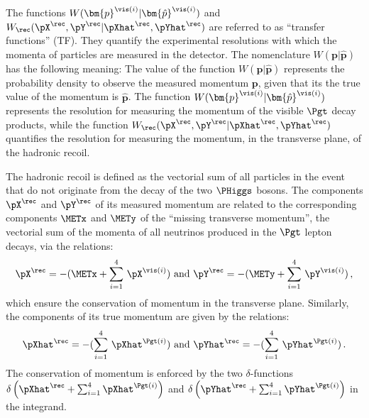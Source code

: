 The functions $W(\bm{p}^{\vis(i)}|\bm{\hat{p}}^{\vis(i)})$ and $W_{\rec}( \pX^{\rec},\pY^{\rec} | \pXhat^{\rec},\pYhat^{\rec} )$ are referred to as ``transfer functions'' (TF).
They quantify the experimental resolutions with which the momenta of particles are measured in the detector.
The nomenclature $W(\bm{p}|\bm{\hat{p}})$ has the following meaning:
The value of the function $W(\bm{p}|\bm{\hat{p}})$ represents the probability density to observe the measured momentum $\bm{p}$,
given that its the true value of the momentum is $\bm{\hat{p}}$.
The function $W(\bm{p}^{\vis(i)}|\bm{\hat{p}}^{\vis(i)})$ represents the resolution for measuring the momentum of the visible $\Pgt$ decay products,
while the function $W_{\rec}( \pX^{\rec},\pY^{\rec} | \pXhat^{\rec},\pYhat^{\rec} )$ quantifies the resolution for measuring the momentum, in the transverse plane, of the hadronic recoil.

The hadronic recoil is defined as the vectorial sum of all particles in the event that do not originate from the decay of the two $\PHiggs$ bosons.
The components $\pX^{\rec}$ and $\pY^{\rec}$ of its measured momentum are related to the corresponding components $\METx$ and $\METy$ of the ``missing transverse momentum'',
the vectorial sum of the momenta of all neutrinos produced in the $\Pgt$ lepton decays, via the relations:
\begin{equation*}
\pX^{\rec} = -( \METx + \sum_{i=1}^{4} \, \pX^{\vis(i)} ) \mbox{ and } \pY^{\rec} = -( \METy + \sum_{i=1}^{4} \, \pY^{\vis(i)} ) \, ,
\end{equation*}
which ensure the conservation of momentum in the transverse plane.
Similarly, the components of its true momentum are given by the relations:
\begin{equation*}
\pXhat^{\rec} = -( \sum_{i=1}^{4} \, \pXhat^{\Pgt(i)} ) \mbox{ and } \pYhat^{\rec} = -( \sum_{i=1}^{4} \, \pYhat^{\Pgt(i)} ) \, .
\end{equation*}
The conservation of momentum is enforced by the two $\delta$-functions
$\delta\left( \pXhat^{\rec} + \sum_{i=1}^{4} \pXhat^{\Pgt(i)} \right)$ and $\delta\left( \pYhat^{\rec} + \sum_{i=1}^{4} \pYhat^{\Pgt(i)} \right)$
in the integrand.

